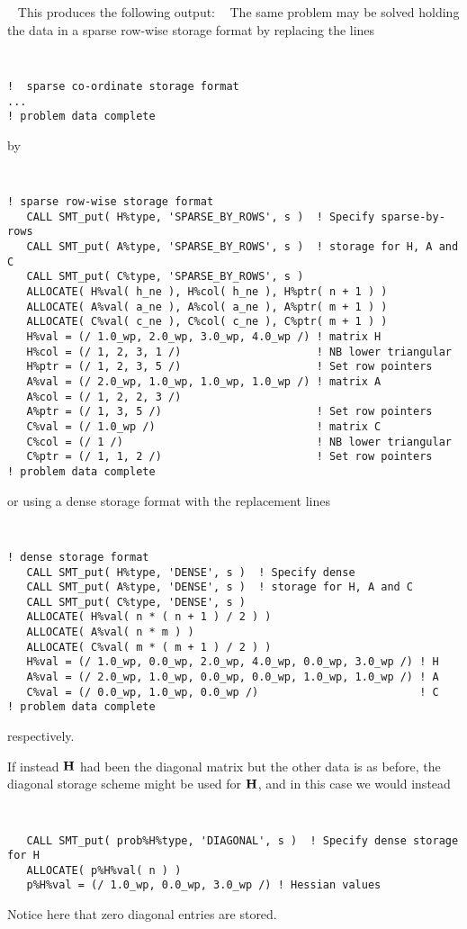 \documentclass{galahad}
\begin{document}
{\tt \small
\VerbatimInput{\packageexample}
}
\noindent
This produces the following output:
{\tt \small
\VerbatimInput{\packageresults}
}
\noindent
The same problem may be solved holding the data in
a sparse row-wise storage format by replacing the lines
{\tt \small
\begin{verbatim}
!  sparse co-ordinate storage format
...
! problem data complete
\end{verbatim}
}
\noindent
by
{\tt \small
\begin{verbatim}
! sparse row-wise storage format
   CALL SMT_put( H%type, 'SPARSE_BY_ROWS', s )  ! Specify sparse-by-rows
   CALL SMT_put( A%type, 'SPARSE_BY_ROWS', s )  ! storage for H, A and C
   CALL SMT_put( C%type, 'SPARSE_BY_ROWS', s )
   ALLOCATE( H%val( h_ne ), H%col( h_ne ), H%ptr( n + 1 ) )
   ALLOCATE( A%val( a_ne ), A%col( a_ne ), A%ptr( m + 1 ) )
   ALLOCATE( C%val( c_ne ), C%col( c_ne ), C%ptr( m + 1 ) )
   H%val = (/ 1.0_wp, 2.0_wp, 3.0_wp, 4.0_wp /) ! matrix H
   H%col = (/ 1, 2, 3, 1 /)                     ! NB lower triangular
   H%ptr = (/ 1, 2, 3, 5 /)                     ! Set row pointers
   A%val = (/ 2.0_wp, 1.0_wp, 1.0_wp, 1.0_wp /) ! matrix A
   A%col = (/ 1, 2, 2, 3 /)
   A%ptr = (/ 1, 3, 5 /)                        ! Set row pointers
   C%val = (/ 1.0_wp /)                         ! matrix C
   C%col = (/ 1 /)                              ! NB lower triangular
   C%ptr = (/ 1, 1, 2 /)                        ! Set row pointers
! problem data complete
\end{verbatim}
}
\noindent
or using a dense storage format with the replacement lines
{\tt \small
\begin{verbatim}
! dense storage format
   CALL SMT_put( H%type, 'DENSE', s )  ! Specify dense
   CALL SMT_put( A%type, 'DENSE', s )  ! storage for H, A and C
   CALL SMT_put( C%type, 'DENSE', s )
   ALLOCATE( H%val( n * ( n + 1 ) / 2 ) )
   ALLOCATE( A%val( n * m ) )
   ALLOCATE( C%val( m * ( m + 1 ) / 2 ) )
   H%val = (/ 1.0_wp, 0.0_wp, 2.0_wp, 4.0_wp, 0.0_wp, 3.0_wp /) ! H
   A%val = (/ 2.0_wp, 1.0_wp, 0.0_wp, 0.0_wp, 1.0_wp, 1.0_wp /) ! A
   C%val = (/ 0.0_wp, 1.0_wp, 0.0_wp /)                         ! C
! problem data complete
\end{verbatim}
}
\noindent
respectively.

If instead ${\mathbf{H}}$ had been the diagonal matrix
but the other data is as before, the diagonal storage scheme
might be used for ${\mathbf{H}}$, and in this case we would instead
{\tt \small
\begin{verbatim}
   CALL SMT_put( prob%H%type, 'DIAGONAL', s )  ! Specify dense storage for H
   ALLOCATE( p%H%val( n ) )
   p%H%val = (/ 1.0_wp, 0.0_wp, 3.0_wp /) ! Hessian values
\end{verbatim}
}
\noindent
Notice here that zero diagonal entries are stored.
\end{document}
